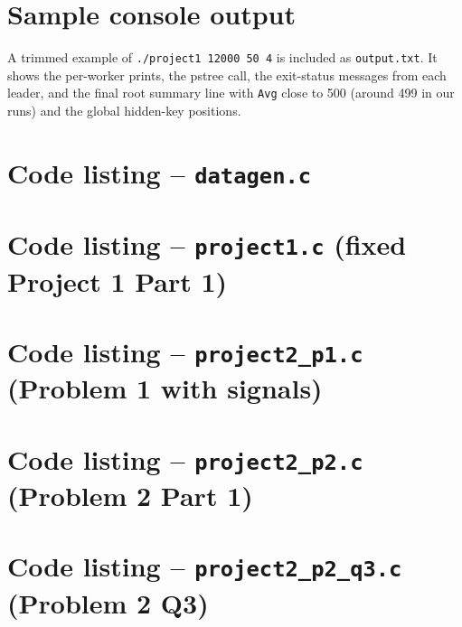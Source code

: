\documentclass[11pt]{article}
\begin{document}
\section*{Sample console output}
A trimmed example of \texttt{./project1 12000 50 4} is included as
\texttt{output.txt}. It shows the per-worker prints, the pstree call, the
exit-status messages from each leader, and the final root summary line with
\texttt{Avg} close to 500 (around 499 in our runs) and the global hidden-key
positions.

\clearpage
\section*{Code listing -- \texttt{datagen.c}}


\clearpage
\section*{Code listing -- \texttt{project1.c} (fixed Project 1 Part 1)}


\clearpage
\section*{Code listing -- \texttt{project2\_p1.c} (Problem 1 with signals)}


\clearpage
\section*{Code listing -- \texttt{project2\_p2.c} (Problem 2 Part 1)}


\clearpage
\section*{Code listing -- \texttt{project2\_p2\_q3.c} (Problem 2 Q3)}

\end{document}
